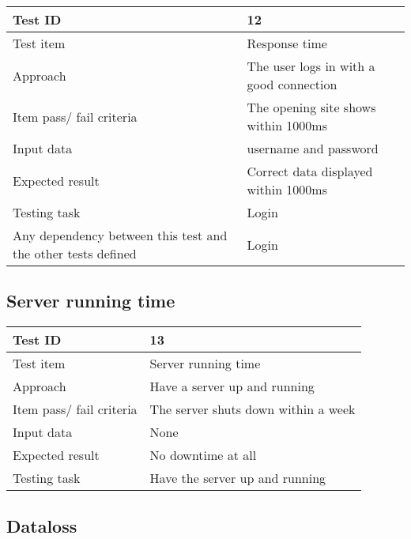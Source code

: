 \documentclass[a4paper, 10pt]{article}
\begin{document}
\begin{tabularx}{\textwidth}{ |X|X| }
\hline
\rowcolor{Gray}
Test ID & 12 \\ \hline
Test item & Response time \\ \hline
Approach & The user logs in with a good connection \\ \hline
Item pass/ fail criteria & The opening site shows within 1000ms\\ \hline
Input data &
username and password\\ \hline
Expected result &
Correct data displayed within 1000ms \\ \hline
Testing task & Login \\ \hline
Any dependency between this test and the other tests defined & Login \\ \hline

\end{tabularx}

\subsection{Server running time}

\begin{tabularx}{\textwidth}{ |X|X| }
\hline
\rowcolor{Gray}
Test ID & 13 \\ \hline
Test item & Server running time \\ \hline
Approach & Have a server up and running \\ \hline
Item pass/ fail criteria & The server shuts down within a week\\ \hline
Input data & None\\ \hline
Expected result &
No downtime at all\\ \hline
Testing task & Have the server up and running \\ \hline
\end{tabularx}

\subsection{Dataloss}
\end{document}
